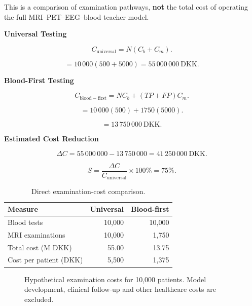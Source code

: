 \documentclass[11pt,a4paper]{article}
\newcommand{\subheading}[1]{%
    \vspace{3mm}
    {\large\bfseries\color{DTUblue}#1}\par
}
\begin{document}
This is a comparison of examination pathways,
\textbf{not} the total cost of operating the
full MRI--PET--EEG--blood teacher model.

\subheading{Universal Testing}

\[
C_{\mathrm{universal}}
=N(C_b+C_m).
\]

\[
=10\,000(500+5000)
=\boxed{55\,000\,000\ \mathrm{DKK}}.
\]

\subheading{Blood-First Testing}

\[
C_{\mathrm{blood-first}}
=NC_b+(TP+FP)C_m.
\]

\[
=10\,000(500)+1750(5000).
\]

\[
=\boxed{13\,750\,000\ \mathrm{DKK}}.
\]

\subheading{Estimated Cost Reduction}

\[
\Delta C
=55\,000\,000-13\,750\,000
=41\,250\,000\ \mathrm{DKK}.
\]

\[
S=\frac{\Delta C}{C_{\mathrm{universal}}}
\times100\%
=\boxed{75\%}.
\]

\begin{table}[H]
\centering
\caption{Direct examination-cost comparison.}
\begin{tabularx}{\linewidth}{@{}Xrr@{}}
\toprule
\textbf{Measure}
& \textbf{Universal}
& \textbf{Blood-first} \\
\midrule
Blood tests & 10,000 & 10,000 \\
MRI examinations & 10,000 & 1,750 \\
Total cost (M DKK) & 55.00 & 13.75 \\
Cost per patient (DKK) & 5,500 & 1,375 \\
\bottomrule
\end{tabularx}
\end{table}

\begin{figure}[H]
\centering
{}
\caption{
Hypothetical examination costs for 10,000 patients.
Model development, clinical follow-up and
other healthcare costs are excluded.
}
\end{figure}
\end{document}
